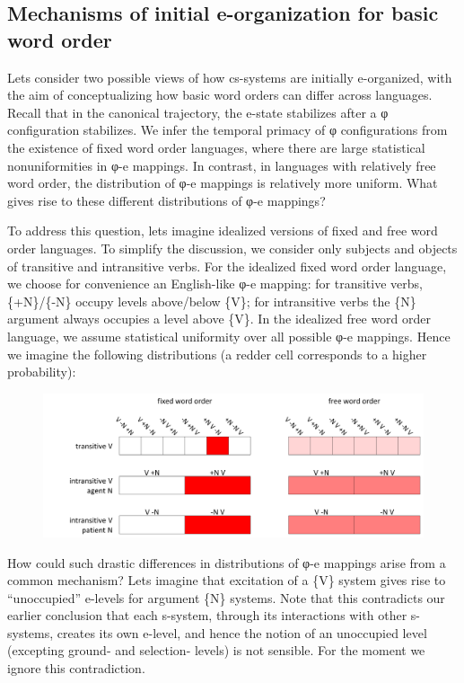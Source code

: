 \subsection{Mechanisms of initial e-organization for basic word order}

Lets consider two possible views of how cs-systems are initially e-organized, with the aim of conceptualizing how basic word orders can differ across languages. Recall that in the canonical trajectory, the e-state stabilizes after a φ configuration stabilizes. We infer the temporal primacy of φ configurations from the existence of fixed word order languages, where there are large statistical nonuniformities in φ-e mappings. In contrast, in languages with relatively free word order, the distribution of φ-e mappings is relatively more uniform. What gives rise to these different distributions of φ-e mappings?

  To address this question, lets imagine idealized versions of fixed and free word order languages. To simplify the discussion, we consider only subjects and objects of transitive and intransitive verbs. For the idealized fixed word order language, we choose for convenience an English-like φ-e mapping: for transitive verbs, \{+N\}/\{-N\} occupy levels above/below \{V\}; for intransitive verbs the \{N\} argument always occupies a level above \{V\}. In the idealized free word order language, we assume statistical uniformity over all possible φ-e mappings. Hence we imagine the following distributions (a redder cell corresponds to a higher probability):

  
\begin{figure}
\includegraphics[width=\textwidth]{figures/Tilsen-img74.png}
\caption{\missingcaption}
\label{fig:4:24}
\end{figure}
 

  How could such drastic differences in distributions of φ{}-e mappings arise from a common mechanism? Lets imagine that excitation of a \{V\} system gives rise to “unoccupied” e-levels for argument \{N\} systems. Note that this contradicts our earlier conclusion that each s-system, through its interactions with other s-systems, creates its own e-level, and hence the notion of an unoccupied level (excepting ground- and selection- levels) is not sensible. For the moment we ignore this contradiction.

